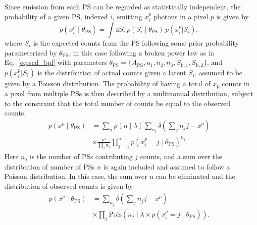 \documentclass[prd,aps,10pt,nofootinbib,twocolumn,superscriptaddress,preprintnumbers,balancelastpage,longbibliography]{revtex4-1}
\begin{document}
Since emission from each PS can be regarded as statistically independent, the probability of a given PS, indexed $i$, emitting $x^p_i$ photons in a pixel $p$ is given by
\begin{equation}
    \label{eq:pixel-wise_likelihood}
    p(x^p_i\mid\theta_\mathrm{PS}) = \int \dd S_i \,p(S_i\mid\theta_\mathrm{PS})\,p(x^p_i|S_i),
\end{equation}
where $S_i$ is the expected counts from the PS following some prior probability parameterized by $\theta_\mathrm{PS}$, in this case following a broken power law as in Eq.~\ref{eq:scd_bpl} with parameters $\theta_\mathrm{PS} = \{A_\mathrm{PS},  n_1, n_2, n_3, S_\mathrm{b,1}, S_\mathrm{b,2}\}$, and $p(x^p_i|S_i)$ is the distribution of actual counts given a latent $S_i$, assumed to be given by a Poisson distribution. The probability of having a total of $x_p$ counts in a pixel from multiple PSs is then described by a multinomial distribution, subject to the constraint that the total number of counts be equal to the observed counts.
\begin{align}
    \label{eq:pixel-wise_likelihood_multinomial}
    p(x^p\mid\theta_\mathrm{PS}) &=  \sum_{n}  p\left(n \mid \lambda\right) \sum_{n_{j}} \delta\left(\sum_j n_{j}j - x^p\right) \\ &\times \frac{n!}{\prod_j n_{j} }\prod_{j=1}^{n} p(x^p_i = j\mid\theta_\mathrm{PS})  ^ {n_{j}}.
\end{align}
Here $n_j$ is the number of PSs contributing $j$ counts, and a sum over the distribution of number of PSs $n$ is again included and assumed to follow a Poisson distribution. In this case, the sum over $n$ can be eliminated and the distribution of observed counts is given by
\begin{align}
    \label{eq:pixel-wise_likelihood_poisson}
    p(x^p\mid\theta_\mathrm{PS}) &= \sum_{n_j} \delta\left(\sum_j n_{j}j - x^p\right) \\ &\times \prod_j \mathrm{Pois}\left(n_{j}\mid\lambda \times p(x^p_i = j\mid\theta_\mathrm{PS})\right).
\end{align}
\end{document}
